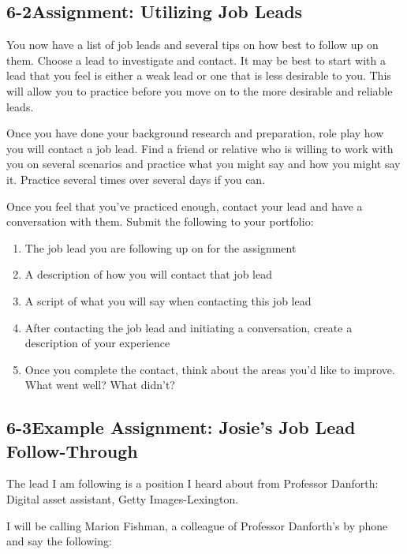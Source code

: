 \pagebreak \subsection*{6-2\quad Assignment: Utilizing Job Leads}
You now have a list of job leads and several tips on how best to follow up on them.
Choose a lead to investigate and contact. It may be best to start with a lead that you feel is either a weak lead or one that is less desirable to you. This will allow you to practice before you move on to the more desirable and reliable leads.

Once you have done your background research and preparation, role play how you will contact a job lead. Find a friend or relative who is willing to work with you on several scenarios and practice what you might say and how you might say it. Practice several times over several days if you can.

Once you feel that you've practiced enough, contact your lead and have a conversation with them. Submit the following to your portfolio:
\begin{enumerate}[leftmargin=0.5cm]
	\item The job lead you are following up on for the assignment
	\item A description of how you will contact that job lead
	\item A script of what you will say when contacting this job lead
	\item After contacting the job lead and initiating a conversation, create a description of your experience
	\item Once you complete the contact, think about the areas you'd like to improve. What went well? What didn't?
\end{enumerate}

\pagebreak \subsection*{6-3\quad Example Assignment: Josie's Job Lead Follow-Through}

The lead I am following is a position I heard about from Professor Danforth: Digital asset assistant, Getty Images-Lexington.

I will be calling Marion Fishman, a colleague of Professor Danforth's by phone and say the following:

